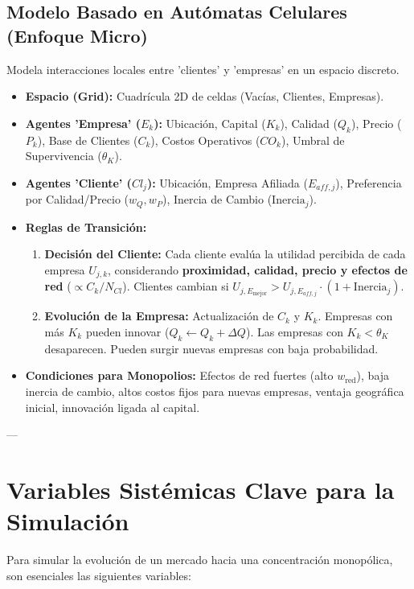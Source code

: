 \documentclass{article}
\begin{document}
\subsection{Modelo Basado en Autómatas Celulares (Enfoque Micro)}
Modela interacciones locales entre 'clientes' y 'empresas' en un espacio discreto.
\begin{itemize}
    \item \textbf{Espacio (Grid):} Cuadrícula 2D de celdas (Vacías, Clientes, Empresas).
    \item \textbf{Agentes 'Empresa' ($E_k$):} Ubicación, Capital ($K_k$), Calidad ($Q_k$), Precio ($P_k$), Base de Clientes ($C_k$), Costos Operativos ($CO_k$), Umbral de Supervivencia ($\theta_K$).
    \item \textbf{Agentes 'Cliente' ($Cl_j$):} Ubicación, Empresa Afiliada ($E_{aff,j}$), Preferencia por Calidad/Precio ($w_Q, w_P$), Inercia de Cambio ($\text{Inercia}_j$).
    \item \textbf{Reglas de Transición:}
        \begin{enumerate}
            \item \textbf{Decisión del Cliente:} Cada cliente evalúa la utilidad percibida de cada empresa $U_{j,k}$, considerando \textbf{proximidad, calidad, precio y efectos de red} ($\propto C_k/N_{Cl}$). Clientes cambian si $U_{j,E_{\text{mejor}}} > U_{j,E_{aff,j}} \cdot (1 + \text{Inercia}_j)$.
            \item \textbf{Evolución de la Empresa:} Actualización de $C_k$ y $K_k$. Empresas con más $K_k$ pueden innovar ($Q_k \leftarrow Q_k + \Delta Q$). Las empresas con $K_k < \theta_K$ desaparecen. Pueden surgir nuevas empresas con baja probabilidad.
        \end{enumerate}
    \item \textbf{Condiciones para Monopolios:} Efectos de red fuertes (alto $w_{\text{red}}$), baja inercia de cambio, altos costos fijos para nuevas empresas, ventaja geográfica inicial, innovación ligada al capital.
\end{itemize}

---

\section{Variables Sistémicas Clave para la Simulación}

Para simular la evolución de un mercado hacia una concentración monopólica, son esenciales las siguientes variables:
\end{document}
